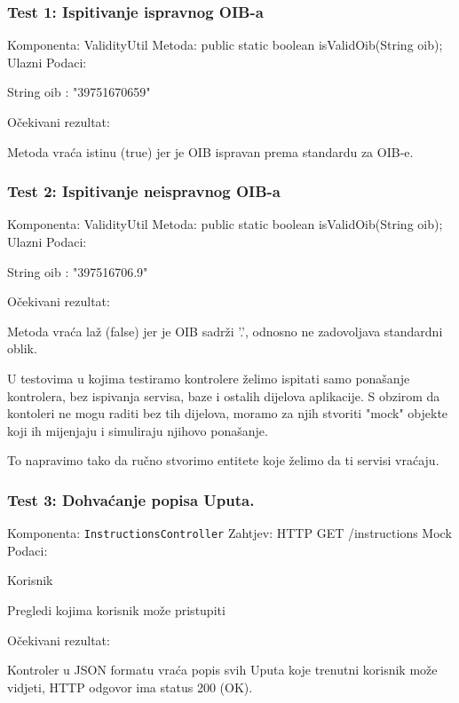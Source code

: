 			\subsubsection*{Test 1: Ispitivanje ispravnog OIB-a}
			Komponenta: ValidityUtil \newline
			Metoda: public static boolean isValidOib(String oib); \newline
			Ulazni Podaci: 
			\begin{packed_item}
				\item String oib : "39751670659"
			\end{packed_item}
			Očekivani rezultat:
			\begin{packed_item}
				\item Metoda vraća istinu (true) jer je OIB ispravan prema standardu za OIB-e.
			\end{packed_item}

			\subsubsection*{Test 2: Ispitivanje neispravnog OIB-a}
			Komponenta: ValidityUtil \newline
			Metoda: public static boolean isValidOib(String oib); \newline
			Ulazni Podaci: 
			\begin{packed_item}
				\item String oib : "397516706.9"
			\end{packed_item}
			Očekivani rezultat:
			\begin{packed_item}
				\item Metoda vraća laž (false) jer je OIB sadrži '.', odnosno ne zadovoljava standardni oblik.
			\end{packed_item}

			U testovima u kojima testiramo kontrolere želimo ispitati samo ponašanje kontrolera, bez ispivanja servisa, baze i ostalih dijelova aplikacije.
			S obzirom da kontoleri ne mogu raditi bez tih dijelova, moramo za njih stvoriti "mock" objekte koji ih mijenjaju i simuliraju njihovo ponašanje.

			To napravimo tako da ručno stvorimo entitete koje želimo da ti servisi vraćaju.

			\subsubsection*{Test 3: Dohvaćanje popisa Uputa.}
			Komponenta: \lstinline[language=Java]{InstructionsController} \newline
			Zahtjev: HTTP GET /instructions \newline
			Mock Podaci:
			\begin{packed_item}
				\item Korisnik
				\item Pregledi kojima korisnik može pristupiti
			\end{packed_item}
			Očekivani rezultat:
			\begin{packed_item}
				\item Kontroler u JSON formatu vraća popis svih Uputa koje trenutni korisnik može vidjeti, HTTP odgovor ima status 200 (OK).
			\end{packed_item}
			
